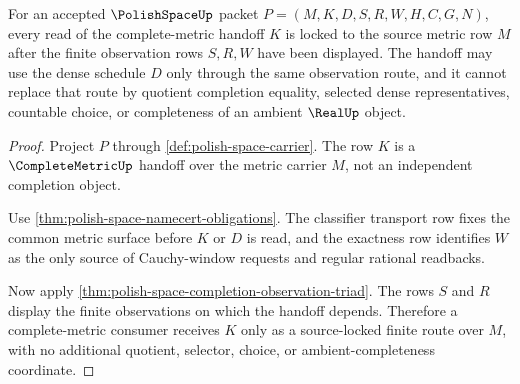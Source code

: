 \begin{theorem}
\label{thm:polish-space-complete-metric-source-lock}
For an accepted $\PolishSpaceUp$ packet $P=(M,K,D,S,R,W,H,C,G,N)$, every read of the complete-metric handoff $K$ is locked to the source metric row $M$ after the finite observation rows $S,R,W$ have been displayed. The handoff may use the dense schedule $D$ only through the same observation route, and it cannot replace that route by quotient completion equality, selected dense representatives, countable choice, or completeness of an ambient $\RealUp$ object.
\end{theorem}
\begin{proof}
Project $P$ through \autoref{def:polish-space-carrier}. The row $K$ is a $\CompleteMetricUp$ handoff over the metric carrier $M$, not an independent completion object.

Use \autoref{thm:polish-space-namecert-obligations}. The classifier transport row fixes the common metric surface before $K$ or $D$ is read, and the exactness row identifies $W$ as the only source of Cauchy-window requests and regular rational readbacks.

Now apply \autoref{thm:polish-space-completion-observation-triad}. The rows $S$ and $R$ display the finite observations on which the handoff depends. Therefore a complete-metric consumer receives $K$ only as a source-locked finite route over $M$, with no additional quotient, selector, choice, or ambient-completeness coordinate.
\end{proof}

